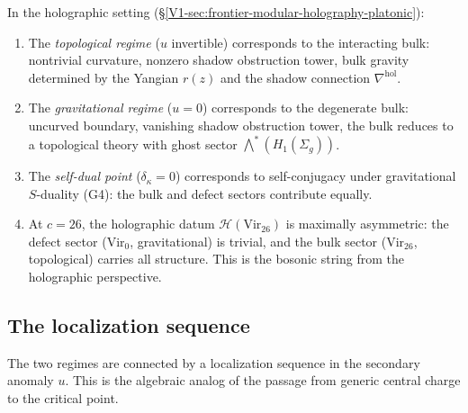 \begin{remark}
In the holographic setting
(\S\ref{V1-sec:frontier-modular-holography-platonic}):
\begin{enumerate}[label=\textup{(\alph*)}]
\item The \emph{topological regime} ($u$ invertible) corresponds to
the interacting bulk: nontrivial curvature, nonzero shadow obstruction tower,
bulk gravity determined by the Yangian $r(z)$ and the shadow
connection $\nabla^{\mathrm{hol}}$.

\item The \emph{gravitational regime} ($u = 0$) corresponds to the
degenerate bulk: uncurved boundary, vanishing shadow obstruction tower, the bulk
reduces to a topological theory with ghost sector
$\bigwedge^*(H_1(\Sigma_g))$.

\item The \emph{self-dual point} ($\delta_\kappa = 0$)
corresponds to self-conjugacy under gravitational $S$-duality (G4):
the bulk and defect sectors contribute equally.

\item At $c = 26$, the holographic datum
$\mathcal{H}(\mathrm{Vir}_{26})$ is maximally asymmetric: the defect
sector ($\mathrm{Vir}_0$, gravitational) is trivial, and the bulk
sector ($\mathrm{Vir}_{26}$, topological) carries all structure. This
is the bosonic string from the holographic perspective.
\end{enumerate}
\end{remark}

%
%

\subsection{The localization sequence}

The two regimes are connected by a localization sequence in the
secondary anomaly $u$. This is the algebraic analog of the passage
from generic central charge to the critical point.

